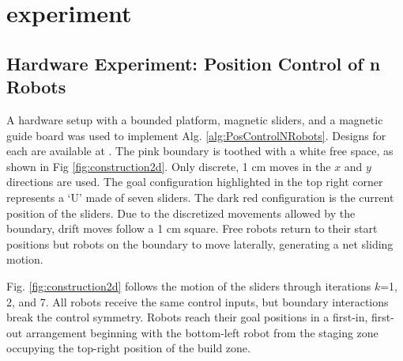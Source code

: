 
\section{experiment}\label{sec:expResults}

\subsection{Hardware Experiment: Position Control of n Robots}
A hardware setup with a bounded platform, magnetic sliders, and a magnetic guide board was used to implement  Alg. \ref{alg:PosControlNRobots}. 
  Designs for each are available at \citep{Arun2016Thingiverse}. 
  The pink boundary is toothed with a white free space, as shown in Fig \ref{fig:construction2d}.
    Only discrete, 1 cm moves in the $x$ and $y$ directions are used. The goal configuration highlighted in the top right corner represents a `U' made of seven sliders. The dark red configuration is the current position of the sliders. 
Due to the discretized movements allowed by the boundary, drift moves follow a 1 cm square.  Free robots return to their start positions but robots on the boundary to move laterally, generating a net sliding motion.

Fig. \ref{fig:construction2d} follows the motion of the sliders through iterations  $k$=1, 2, and 7. All robots receive the same control inputs, but boundary interactions break the control symmetry.  Robots reach their goal positions in a first-in, first-out arrangement beginning with the bottom-left robot from the staging zone occupying the top-right position of the build zone.

